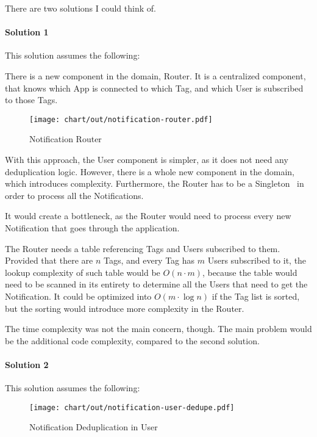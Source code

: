 There are two solutions I could think of.

\paragraph*{Solution 1}\label{par:duplication-solution-1}

This solution assumes the following:

There is a new component in the domain, Router.
It is a centralized component,
that knows which App is connected to which Tag,
and which User is subscribed to those Tags.

\begin{figure}[h]
  \centering
  \texttt{[image: chart/out/notification-router.pdf]}
  \caption{Notification Router}
  \label{fig:notification-router}
\end{figure}

With this approach,
the User component is simpler,
as it does not need any deduplication logic.
However, there is a whole new component
in the domain, which introduces complexity.
Furthermore, the Router has to be
a Singleton~\cite[pp.~127-134]{gamma_design_1994}
in order to process all the Notifications.

It would create a bottleneck,
as the Router would need to process every new Notification
that goes through the application.

The Router needs a table referencing
Tags and Users subscribed to them.
Provided that there are $n$ Tags,
and every Tag has $m$ Users subscribed to it,
the lookup complexity of such table
would be $O(n \cdot m)$,
because the table would need to be
scanned in its entirety to determine
all the Users that need to get the Notification.
It could be optimized into $O(m \cdot \log n)$
if the Tag list is sorted,
but the sorting would introduce
more complexity in the Router.

The time complexity was not the main concern, though.
The main problem would be
the additional code complexity,
compared to the second solution.

\paragraph*{Solution 2}\label{par:duplication-solution-2}

This solution assumes the following:

\begin{figure}[h]
  \centering
  \texttt{[image: chart/out/notification-user-dedupe.pdf]}
  \caption{Notification Deduplication in User}
  \label{fig:notification-user-dedupe}
\end{figure}

